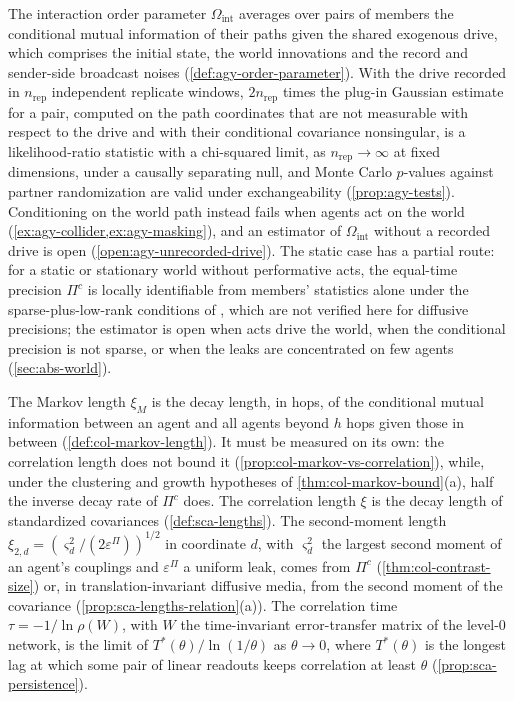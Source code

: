 The interaction order parameter $\Omega_{\mathrm{int}}$ averages over pairs of members the conditional mutual information of their paths given the shared exogenous drive, which comprises the initial state, the world innovations and the record and sender-side broadcast noises (\cref{def:agy-order-parameter}). With the drive recorded in $n_{\mathrm{rep}}$ independent replicate windows, $2n_{\mathrm{rep}}$ times the plug-in Gaussian estimate for a pair, computed on the path coordinates that are not measurable with respect to the drive and with their conditional covariance nonsingular, is a likelihood-ratio statistic with a chi-squared limit, as $n_{\mathrm{rep}}\to\infty$ at fixed dimensions, under a causally separating null, and Monte Carlo $p$-values against partner randomization are valid under exchangeability (\cref{prop:agy-tests}). Conditioning on the world path instead fails when agents act on the world (\cref{ex:agy-collider,ex:agy-masking}), and an estimator of $\Omega_{\mathrm{int}}$ without a recorded drive is open (\cref{open:agy-unrecorded-drive}). The static case has a partial route: for a static or stationary world without performative acts, the equal-time precision $\Pi^c$ is locally identifiable from members' statistics alone under the sparse-plus-low-rank conditions of \citet{chandrasekaran2012latent}, which are not verified here for diffusive precisions; the estimator is open when acts drive the world, when the conditional precision is not sparse, or when the leaks are concentrated on few agents (\cref{sec:abs-world}).

The Markov length $\xi_M$ is the decay length, in hops, of the conditional mutual information between an agent and all agents beyond $h$ hops given those in between (\cref{def:col-markov-length}). It must be measured on its own: the correlation length does not bound it (\cref{prop:col-markov-vs-correlation}), while, under the clustering and growth hypotheses of \cref{thm:col-markov-bound}(a), half the inverse decay rate of $\Pi^c$ does. The correlation length $\xi$ is the decay length of standardized covariances (\cref{def:sca-lengths}). The second-moment length $\xi_{2,d}=(\varsigma_d^2/(2\varepsilon^\Pi))^{1/2}$ in coordinate $d$, with $\varsigma_d^2$ the largest second moment of an agent's couplings and $\varepsilon^\Pi$ a uniform leak, comes from $\Pi^c$ (\cref{thm:col-contrast-size}) or, in translation-invariant diffusive media, from the second moment of the covariance (\cref{prop:sca-lengths-relation}(a)). The correlation time $\tau=-1/\ln\rho(W)$, with $W$ the time-invariant error-transfer matrix of the level-0 network, is the limit of $T^\ast(\theta)/\ln(1/\theta)$ as $\theta\to0$, where $T^\ast(\theta)$ is the longest lag at which some pair of linear readouts keeps correlation at least $\theta$ (\cref{prop:sca-persistence}).

